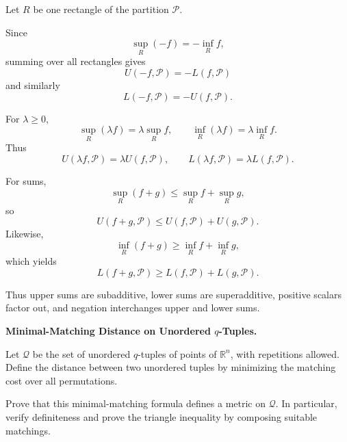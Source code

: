 \begin{solution}
Let \(R\) be one rectangle of the partition \(\mathcal P\).

Since
\[
\sup_R(-f)=-\inf_R f,
\]
summing over all rectangles gives
\[
\boxed{
U(-f,\mathcal P)=-L(f,\mathcal P)
}
\]
and similarly
\[
\boxed{
L(-f,\mathcal P)=-U(f,\mathcal P).
}
\]

For \(\lambda\ge0\),
\[
\sup_R(\lambda f)=\lambda\sup_R f,
\qquad
\inf_R(\lambda f)=\lambda\inf_R f.
\]
Thus
\[
\boxed{
U(\lambda f,\mathcal P)=\lambda U(f,\mathcal P),
\qquad
L(\lambda f,\mathcal P)=\lambda L(f,\mathcal P).
}
\]

For sums,
\[
\sup_R(f+g)
\le
\sup_Rf+\sup_Rg,
\]
so
\[
\boxed{
U(f+g,\mathcal P)
\le
U(f,\mathcal P)+U(g,\mathcal P).
}
\]
Likewise,
\[
\inf_R(f+g)
\ge
\inf_Rf+\inf_Rg,
\]
which yields
\[
\boxed{
L(f+g,\mathcal P)
\ge
L(f,\mathcal P)+L(g,\mathcal P).
}
\]

Thus upper sums are subadditive, lower sums are superadditive, positive scalars factor out,
and negation interchanges upper and lower sums.
\end{solution}


\begin{problem}[CP-II-0026]
\label{prob:cp-ii-0026}
\textbf{Minimal-Matching Distance on Unordered \(q\)-Tuples.}

\hspace*{1.5em}Let \(\mathcal Q\) be the set of unordered \(q\)-tuples of points of
\(\mathbb R^n\), with repetitions allowed. Define the distance between two
unordered tuples by minimizing the matching cost over all permutations.

Prove that this minimal-matching formula defines a metric on \(\mathcal Q\).
In particular, verify definiteness and prove the triangle inequality by
composing suitable matchings.
\end{problem}

